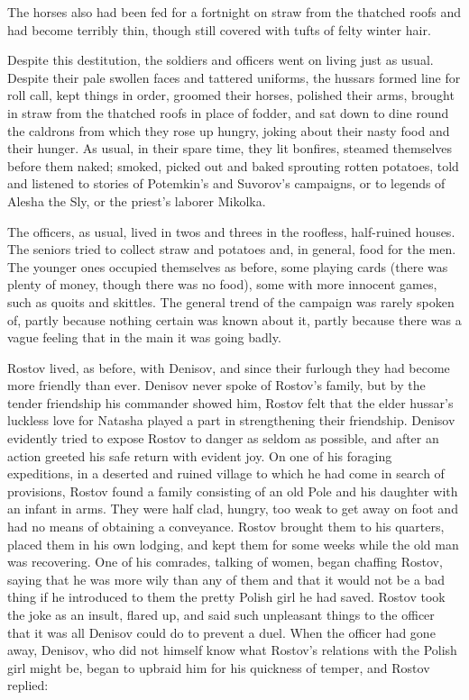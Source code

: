 The horses also had been fed for a fortnight on straw from the
thatched roofs and had become terribly thin, though still covered
with tufts of felty winter hair.

Despite this destitution, the soldiers and officers went on
living just as usual. Despite their pale swollen faces and
tattered uniforms, the hussars formed line for roll call, kept
things in order, groomed their horses, polished their arms,
brought in straw from the thatched roofs in place of fodder, and
sat down to dine round the caldrons from which they rose up
hungry, joking about their nasty food and their hunger. As usual,
in their spare time, they lit bonfires, steamed themselves before
them naked; smoked, picked out and baked sprouting rotten
potatoes, told and listened to stories of Potemkin's and
Suvorov's campaigns, or to legends of Alesha the Sly, or the
priest's laborer Mikolka.

The officers, as usual, lived in twos and threes in the roofless,
half-ruined houses. The seniors tried to collect straw and
potatoes and, in general, food for the men. The younger ones
occupied themselves as before, some playing cards (there was
plenty of money, though there was no food), some with more
innocent games, such as quoits and skittles.  The general trend
of the campaign was rarely spoken of, partly because nothing
certain was known about it, partly because there was a vague
feeling that in the main it was going badly.

Rostov lived, as before, with Denisov, and since their furlough
they had become more friendly than ever. Denisov never spoke of
Rostov's family, but by the tender friendship his commander
showed him, Rostov felt that the elder hussar's luckless love for
Natasha played a part in strengthening their friendship. Denisov
evidently tried to expose Rostov to danger as seldom as possible,
and after an action greeted his safe return with evident joy. On
one of his foraging expeditions, in a deserted and ruined village
to which he had come in search of provisions, Rostov found a
family consisting of an old Pole and his daughter with an infant
in arms. They were half clad, hungry, too weak to get away on
foot and had no means of obtaining a conveyance. Rostov brought
them to his quarters, placed them in his own lodging, and kept
them for some weeks while the old man was recovering. One of his
comrades, talking of women, began chaffing Rostov, saying that he
was more wily than any of them and that it would not be a bad
thing if he introduced to them the pretty Polish girl he had
saved. Rostov took the joke as an insult, flared up, and said
such unpleasant things to the officer that it was all Denisov
could do to prevent a duel. When the officer had gone away,
Denisov, who did not himself know what Rostov's relations with
the Polish girl might be, began to upbraid him for his quickness
of temper, and Rostov replied:

